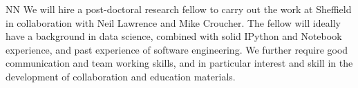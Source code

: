 \begin{participant}[type=R, PM=36]{NN}
  We will hire a post-doctoral research fellow to carry out the work
  at Sheffield in collaboration with Neil Lawrence and Mike
  Croucher. The fellow will ideally have a background in data science,
  combined with solid IPython and \Jupyter{} Notebook experience, and
  past experience of software engineering. We further require good
  communication and team working skills, and in particular interest
  and skill in the development of collaboration and education
  materials. 
\end{participant}